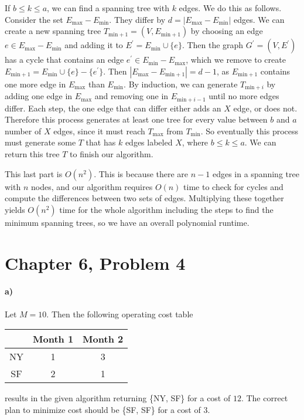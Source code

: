 \documentclass[12pt]{article}
\begin{document}
If \(b\leq k \leq a\), we can find a spanning tree with \(k\) edges. We do this as follows. Consider the set
\(E_\text{max}-E_\text{min}\). They differ by \(d=|E_\text{max}-E_\text{min}|\) edges. We can create a new spanning tree \(T_{\text{min}+1}=(V,E_{\text{min}+1})\)
by choosing an edge \(e\in E_\text{max}-E_\text{min}\) and adding it to \(E^\prime = E_\text{min}\cup \{e\}\). Then the graph \(G^\prime=(V,E^\prime)\)
has a cycle that contains an edge \(e^\prime\in E_\text{min}-E_\text{max}\), which we remove to create \(E_{\text{min}+1} = E_\text{min}\cup \{e\}-\{e^\prime\}\).
Then \(|E_\text{max}-E_{\text{min}+1}|=d-1\), as \(E_{\text{min}+1}\) contains one more edge in \(E_\text{max}\) than \(E_\text{min}\). By induction,
we can generate \(T_{\text{min}+i}\) by adding one edge in \(E_\text{max}\) and removing one in \(E_{\text{min}+i-1}\) until no more edges differ.
Each step, the one edge that can differ either adds an \(X\) edge, or does not. Therefore this process generates at least one tree for every value between
\(b\) and \(a\) number of \(X\) edges, since it must reach \(T_\text{max}\) from \(T_\text{min}\). So eventually this process must generate some \(T\) that
has \(k\) edges labeled \(X\), where \(b\leq k\leq a\). We can return this tree \(T\) to finish our algorithm.

This last part is \(O(n^2)\). This is because there are \(n-1\) edges in a spanning tree with \(n\) nodes, and our algorithm requires \(O(n)\) time to
check for cycles and compute the differences between two sets of edges. Multiplying these together yields \(O(n^2)\) time for the whole algorithm including the steps
to find the minimum spanning trees, so we have an overall polynomial runtime.

\pagebreak

\section*{Chapter 6, Problem 4}

\paragraph{a)}

Let \(M=10\). Then the following operating cost table
\begin{center}
        \begin{tabular}{c | c c}
                & Month 1 & Month 2\\
                \hline
                NY & 1 & 3\\
                SF & 2 & 1\\
        \end{tabular}
\end{center}
results in the given algorithm returning \{NY, SF\} for a cost of \(12\). The correct plan to minimize
cost should be \{SF, SF\} for a cost of \(3\).
\end{document}
